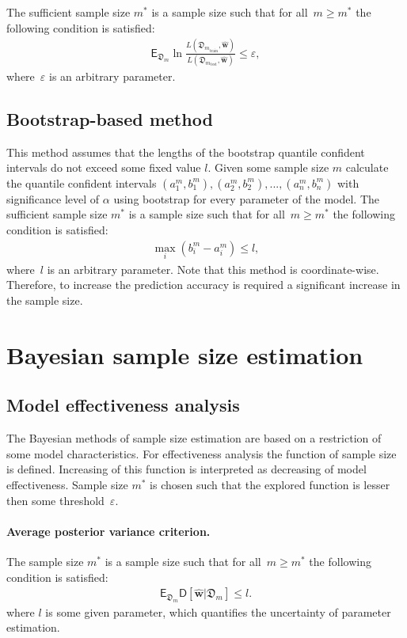 \documentclass[
11pt,%
tightenlines,%
twoside,%
onecolumn,%
nofloats,%
nobibnotes,%
nofootinbib,%
superscriptaddress,%
noshowpacs,%
centertags]%
{revtex4}
\begin{document}
The sufficient sample size $m^*$ is a sample size such that for all~$m \geq m^*$ the following condition is satisfied:
\[
\label{eq:hb:7}
\begin{aligned}
	\mathsf{E}_{\mathfrak{D}_{m}}\ln\frac{L(\mathfrak{D}_{m_{\text{train}}}, \hat{\textbf{w}})}{L(\mathfrak{D}_{m_{\text{test}}}, \hat{\textbf{w}})} \leq \varepsilon,
\end{aligned}
\]
where~$\varepsilon$ is an arbitrary parameter.

\subsection{Bootstrap-based method}
This method assumes that the lengths of the bootstrap quantile confident intervals do not exceed some fixed value $l$. Given some sample size $m$ calculate the quantile confident intervals $\left(a^m_1, b^m_1\right), \left(a^m_2, b^m_2\right), ..., \left(a^m_n, b^m_n\right)$ with significance level of $\alpha$ using bootstrap for every parameter of the model. The sufficient sample size $m^*$ is a sample size such that for all~$m \geq m^*$ the following condition is satisfied:
\[
\label{eq:hb:8}
\begin{aligned}
	\max_i\left(b^m_i - a^m_i\right)  \leq l,
\end{aligned}
\]
where~$l$ is an arbitrary parameter. Note that this method is coordinate-wise. Therefore, to increase the prediction accuracy is required a significant increase in the sample size.
    
\section{Bayesian sample size estimation}
\subsection{Model effectiveness analysis}
The Bayesian methods of sample size estimation are based on a restriction of some model characteristics. For effectiveness analysis the function of sample size is defined. Increasing of this function is interpreted as decreasing of model effectiveness. Sample size $m^*$ is chosen such that the explored function is lesser then some threshold~$\varepsilon$.

\paragraph{Average posterior variance criterion.}
The sample size $m^*$ is a sample size such that for all~$m \geq m^*$ the following condition is satisfied:
\[
\label{eq:bs:1}
\begin{aligned}
	\mathsf{E}_{\mathfrak{D}_m}\mathsf{D}\left[\hat{\textbf{w}}|\mathfrak{D}_m\right] \leq l.
\end{aligned}
\]
where $l$ is some given parameter, which quantifies the uncertainty of parameter estimation.
\end{document}

